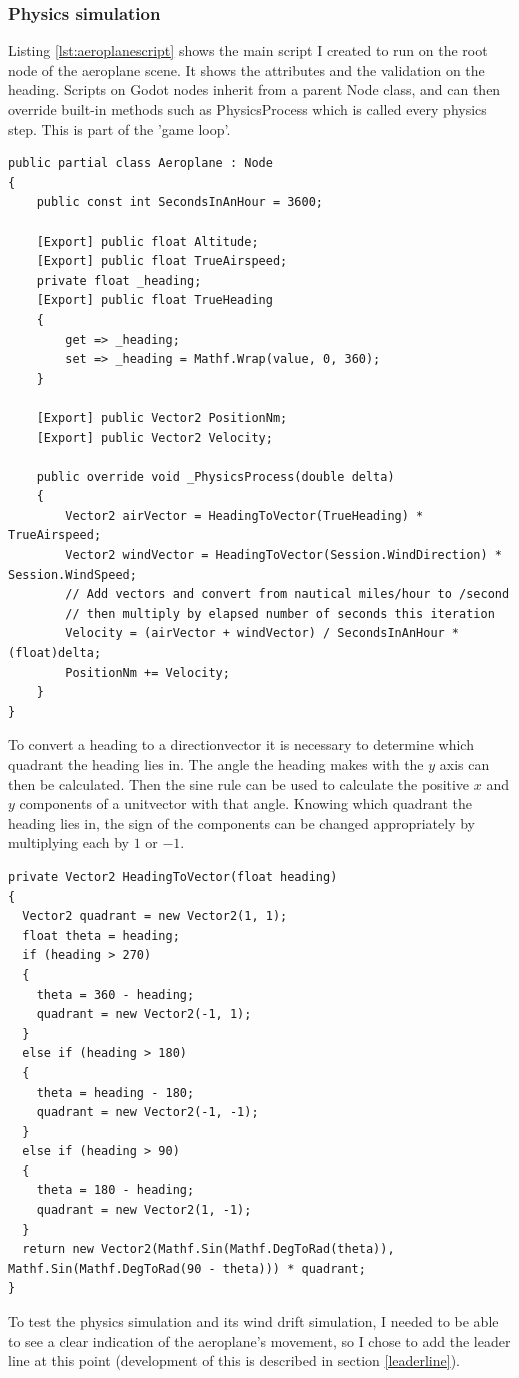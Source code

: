 \documentclass{article}
\begin{document}
\subsubsection{Physics simulation}\label{physicssimulation}
Listing \ref{lst:aeroplanescript} shows the main script I created to run on the root node of the aeroplane scene.
It shows the attributes and the validation on the heading.
Scripts on Godot nodes inherit from a parent Node class, and can then override built-in methods such as PhysicsProcess which is called every physics step.
This is part of the 'game loop'.
\lstset{style=csharp}
\begin{lstlisting}[label={lst:aeroplanescript}, caption=The aeroplane script]
public partial class Aeroplane : Node
{
    public const int SecondsInAnHour = 3600;

    [Export] public float Altitude;
    [Export] public float TrueAirspeed;
    private float _heading;
    [Export] public float TrueHeading
    {
        get => _heading;
        set => _heading = Mathf.Wrap(value, 0, 360);
    }

    [Export] public Vector2 PositionNm;
    [Export] public Vector2 Velocity;

    public override void _PhysicsProcess(double delta)
    {
        Vector2 airVector = HeadingToVector(TrueHeading) * TrueAirspeed;
        Vector2 windVector = HeadingToVector(Session.WindDirection) * Session.WindSpeed;
        // Add vectors and convert from nautical miles/hour to /second
        // then multiply by elapsed number of seconds this iteration
        Velocity = (airVector + windVector) / SecondsInAnHour * (float)delta;
        PositionNm += Velocity;
    }
}
\end{lstlisting}

To convert a \gls{heading} to a \gls{directionvector} it is necessary to determine which \gls{quadrant} the \gls{heading} lies in.
The angle the \gls{heading} makes with the $y$ axis can then be calculated.
Then the sine rule can be used to calculate the positive $x$ and $y$ components of a \gls{unitvector} with that angle.
Knowing which \gls{quadrant} the \gls{heading} lies in, the sign of the components can be changed appropriately by multiplying each by $1$ or $-1$.
\lstset{style=csharp}
\begin{lstlisting}[caption=Converting a heading to a vector]
private Vector2 HeadingToVector(float heading)
{
  Vector2 quadrant = new Vector2(1, 1);
  float theta = heading;
  if (heading > 270)
  {
    theta = 360 - heading;
    quadrant = new Vector2(-1, 1);
  }
  else if (heading > 180)
  {
    theta = heading - 180;
    quadrant = new Vector2(-1, -1);
  }
  else if (heading > 90)
  {
    theta = 180 - heading;
    quadrant = new Vector2(1, -1);
  }
  return new Vector2(Mathf.Sin(Mathf.DegToRad(theta)), Mathf.Sin(Mathf.DegToRad(90 - theta))) * quadrant;
}
\end{lstlisting}
To test the physics simulation and its wind drift simulation, I needed to be able to see a clear indication of the aeroplane's movement, so I chose to add the leader line at this point (development of this is described in section \ref{leaderline}).
\end{document}
